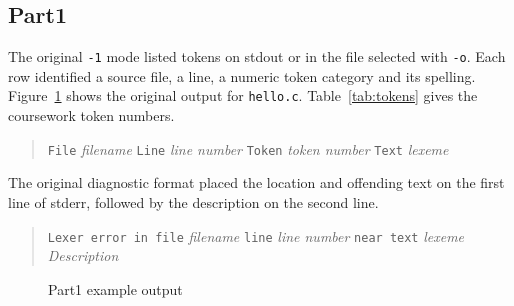 \documentclass{report}
\newcommand{\+}{}
\begin{document}
    \subsection{Part1}\label{subsec:part1}
    The original \verb|-1| mode listed tokens on stdout or in the file selected
    with \verb|-o|. Each row identified a source file, a line, a numeric token
    category and its spelling. Figure~\ref{fig:example_part1_output} shows the
    original output for \verb|hello.c|. Table~\ref{tab:tokens} gives the
    coursework token numbers.

    \begin{quote}
        \texttt{File} \emph{filename} \texttt{Line} \emph{line number}
        \texttt{Token} \emph{token number} \texttt{Text} \emph{lexeme}
    \end{quote}

    The original diagnostic format placed the location and offending text on
    the first line of stderr, followed by the description on the second line.

    \begin{quote}
        \texttt{Lexer error in file} \emph{filename} \texttt{line}
        \emph{line number} \texttt{near text} \emph{lexeme}\\
        \hspace*{1em}\emph{Description}
    \end{quote}

    \begin{figure}[hb!]
        \centering
        \caption{Part1 example output}
        \label{fig:example_part1_output}
    \end{figure}
\end{document}
